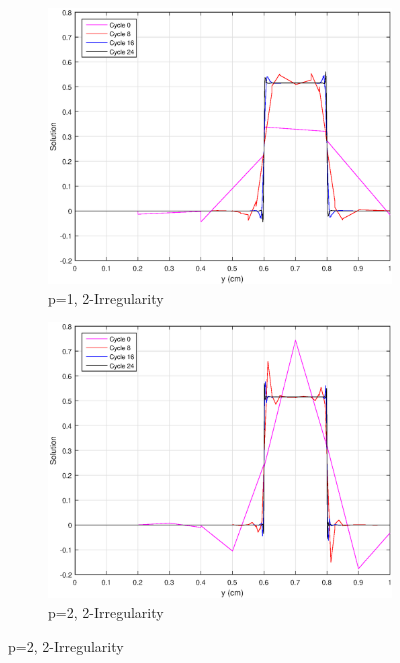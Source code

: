 \begin{figure}
{}
\vspace{2.5mm}
{
	\begin{subfigure}[b]{0.45\textwidth}
		\centering
		\label{subfig::SL_uniform_ef_mv1_irr2}
		\includegraphics[width=\textwidth]{figures/sec_BF/SL_AMR_MV_k1_Irr2.eps}
		\caption{p=1, 2-Irregularity}
	\end{subfigure}
	\hfill
	\begin{subfigure}[b]{0.45\textwidth}
		\centering
		\label{subfig::SL_uniform_ef_mv2_irr2}
		\includegraphics[width=\textwidth]{figures/sec_BF/SL_AMR_MV_k2_Irr2.eps}
		\caption{p=2, 2-Irregularity}
	\end{subfigure}
}
\end{figure}
